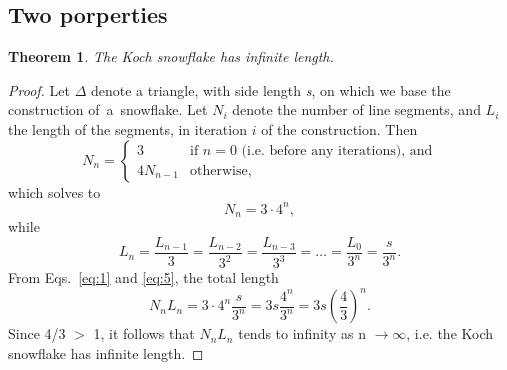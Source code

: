 \documentclass[12pt,a4paper]{article}
\newtheorem{theorem}{Theorem}
\begin{document}
	\subsection{Two porperties}
	\begin{theorem}
	 	\textit{The Koch snowflake has infinite length.}
	\end{theorem}
	\begin{proof}
		Let $\Delta$  denote a triangle, with side length \textit{s}, on which we base the construction 
		of~a~snowflake. Let $N_i$ denote the number of line segments, and  $L_i$ the length of the
		segments, in iteration $i$ of the construction. Then    	
		\begin{displaymath}
			  N_n =
			    \begin{cases}
			      3             & \text{if $n=0$ (i.e.\ before any iterations), and} \\
			     4 N_{n-1}		& \text{otherwise,}
			    \end{cases}
		\end{displaymath}
		which solves to 
		\begin{equation}
		 	\label{eq:1}
		  	 N_n=3\cdot 4^n,
		\end{equation}
		while  
		\begin{equation}
		  \label{eq:5}
		   L_n=\frac{L_{n-1}}{3}=\frac{L_{n-2}}{3^2}=\frac{L_{n-3}}{3^3}=\ldots=\frac{L_0}{3^n}=\frac{s}{3^n}.
		\end{equation}
		From Eqs.~\ref{eq:1} and \ref{eq:5}, the total length 
		\begin{displaymath} 
			  N_nL_n=3\cdot4^n\frac{s}{3^n}=3s\frac{4^n}{3^n}=3s\left(\frac{4}{3}\right)^n.
		\end{displaymath}	
		Since 4/3 $>$ 1, it follows that $ N_{n}L_{n}$ tends to infinity as n $\to \infty$, i.e. the Koch snowflake has infinite length.
	\end{proof}
\end{document}
